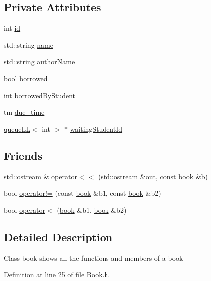 \subsection*{Private Attributes}
\begin{DoxyCompactItemize}
\item 
int \hyperlink{classbook_ad8bf54b50c72af3827823c04d724d824}{id}
\item 
std\+::string \hyperlink{classbook_a5eabc1c1c5abff26997bec3d41f90d9e}{name}
\item 
std\+::string \hyperlink{classbook_a21b2962c6227818732db27f12121b732}{author\+Name}
\item 
bool \hyperlink{classbook_ab745520ed537e69bde6f2e3d7a103276}{borrowed}
\item 
int \hyperlink{classbook_afa5350900be6a34d8301a57d6db54df5}{borrowed\+By\+Student}
\item 
tm \hyperlink{classbook_abf72d9a32cdadee632df5a626dbe33b8}{due\+\_\+time}
\item 
\hyperlink{classqueue_l_l}{queue\+LL}$<$ int $>$ $\ast$ \hyperlink{classbook_a40ce04fcfbf99ffdbe7a4e1463588ee5}{waiting\+Student\+Id}
\end{DoxyCompactItemize}
\subsection*{Friends}
\begin{DoxyCompactItemize}
\item 
std\+::ostream \& \hyperlink{classbook_a9bd0243ea50c5b8c37ed0d5527f24177}{operator$<$$<$} (std\+::ostream \&out, const \hyperlink{classbook}{book} \&b)
\item 
bool \hyperlink{classbook_af7856e28b06865a9691d5c7a330633a4}{operator!=} (const \hyperlink{classbook}{book} \&b1, const \hyperlink{classbook}{book} \&b2)
\item 
bool \hyperlink{classbook_a3d386e1f8255c6b62d9858fb8ff41c86}{operator$<$} (\hyperlink{classbook}{book} \&b1, \hyperlink{classbook}{book} \&b2)
\end{DoxyCompactItemize}


\subsection{Detailed Description}
Class book shows all the functions and members of a book 

Definition at line 25 of file Book.\+h.



